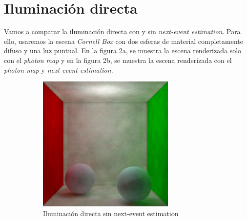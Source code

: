 \documentclass{article}
\begin{document}
\section{Iluminación directa}
Vamos a comparar la iluminación directa con y sin \textit{next-event estimation}.
Para ello, usaremos la escena \textit{Cornell Box} con dos esferas de material
completamente difuso y una luz puntual. En la figura 2a, se muestra
la escena renderizada solo con el \textit{photon map} y en la figura
2b, se muestra la escena renderizada con el \textit{photon map} y
\textit{next-event estimation}.

\begin{figure}
\begin{subfigure}[h]{0.4\linewidth}
\includegraphics[width=\linewidth]{imgs/pml.png}
\caption{Iluminación directa sin next-event estimation}
\end{subfigure}
\hfill
\begin{subfigure}[h]{0.4\linewidth}

\end{subfigure}
\end{figure}
\end{document}
